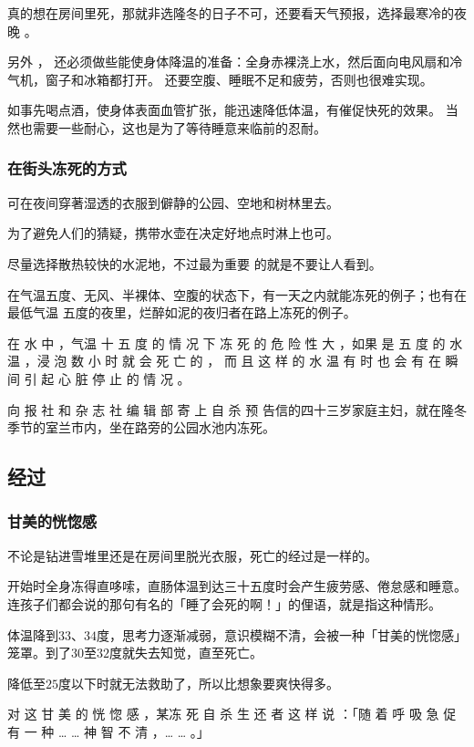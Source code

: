 \documentclass[UTF8]{ctexart}
\begin{document}
真的想在房间里死，那就非选隆冬的日子不可，还要看天气预报，选择最寒冷的夜晚 。

另外 ， 还必须做些能使身体降温的准备：全身赤裸浇上水，然后面向电风扇和冷气机，窗子和冰箱都打开。
还要空腹、睡眠不足和疲劳，否则也很难实现。

如事先喝点酒，使身体表面血管扩张，能迅速降低体温，有催促快死的效果。
当然也需要一些耐心，这也是为了等待睡意来临前的忍耐。


\subsubsection*{在街头冻死的方式}

可在夜间穿著湿透的衣服到僻静的公园、空地和树林里去。

为了避免人们的猜疑，携带水壶在决定好地点时淋上也可。

尽量选择散热较快的水泥地，不过最为重要 的就是不要让人看到。 

在气温五度、无风、半裸体、空腹的状态下，有一天之内就能冻死的例子；也有在最低气温 五度的夜里，烂醉如泥的夜归者在路上冻死的例子。

在 水 中 ，气温 十 五 度 的 情 况 下 冻 死 的 危 险 性 大 ，如果 是 五 度 的 水 温 ，浸 泡 数 小 时 就 会 死 亡 的 ， 而 且 这 样 的 水 温 有 时 也 会 有 在 瞬 间 引 起 心 脏 停 止 的 情 况 。

向 报 社 和 杂 志 社 编 辑 部 寄 上 自 杀 预 告信的四十三岁家庭主妇，就在隆冬季节的室兰市内，坐在路旁的公园水池内冻死。


\subsection{经过}

\subsubsection*{甘美的恍惚感}

不论是钻进雪堆里还是在房间里脱光衣服，死亡的经过是一样的。

开始时全身冻得直哆嗦，直肠体温到达三十五度时会产生疲劳感、倦怠感和睡意。连孩子们都会说的那句有名的「睡了会死的啊！」的俚语，就是指这种情形。

体温降到$33$、$34$度，思考力逐渐减弱，意识模糊不清，会被一种「甘美的恍惚感」笼罩。到了$30$至$32$度就失去知觉，直至死亡。

降低至$25$度以下时就无法救助了，所以比想象要爽快得多。

对 这 甘 美 的 恍 惚 感 ，某冻 死 自 杀 生 还 者 这 样 说 ：「随 着 呼 吸 急 促 有 一 种 … … 神 智 不 清 ，… … 。」
\end{document}

